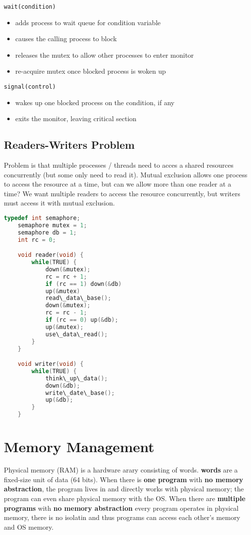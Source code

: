\documentclass{article}
\newcommand{\bold}[1]{\textbf{#1}}
\renewcommand{\b}{\item[$\circ$]}
\newcommand{\newlist}{\begin{itemize}}
\renewcommand{\endlist}{\end{itemize}}
\begin{document}
    \noindent \texttt{wait(condition)}

    \newlist
    \b adds process to wait queue for condition variable
    \b causes the calling process to block
    \b releases the mutex to allow other processes to enter monitor 
    \b re-acquire mutex once blocked process is woken up
    \endlist 

    \noindent \texttt{signal(control)}
    \newlist
    \b wakes up one blocked process on the condition, if any
    \b exits the monitor, leaving critical section
    \endlist 

\subsection{Readers-Writers Problem}

    Problem is that multiple processes / threads need to acces a shared resources concurrently (but some only need to read it). Mutual exclusion allows one process to access the resource at a time, but can we allow more than one reader at a time? We want multiple readers to access the resource concurrently, but writers must access it with mutual exclusion. 

    \begin{lstlisting}[language=C]
    typedef int semaphore;
    semaphore mutex = 1;
    semaphore db = 1;
    int rc = 0;

    void reader(void) {
        while(TRUE) {
            down(&mutex);
            rc = rc + 1;
            if (rc == 1) down(&db)
            up(&mutex)
            read\_data\_base();
            down(&mutex);
            rc = rc - 1;
            if (rc == 0) up(&db);
            up(&mutex);
            use\_data\_read();
        }
    }

    void writer(void) {
        while(TRUE) {
            think\_up\_data();
            down(&db);
            write\_date\_base();
            up(&db);
        }
    }
    \end{lstlisting}

\newpage
\section{Memory Management}

Physical memory (RAM) is a hardware arary consisting of words. \bold{words} are a fixed-size unit of data (64 bits). When there is \bold{one program} with \bold{no memory abstraction}, the program lives in and directly works with physical memory; the program can even share physical memory with the OS. When there are \bold{multiple programs} with \bold{no memory abstraction} every program operates in physical memory, there is no isolatin and thus programs can access each other's memory and OS memory. \\ 
\end{document}
